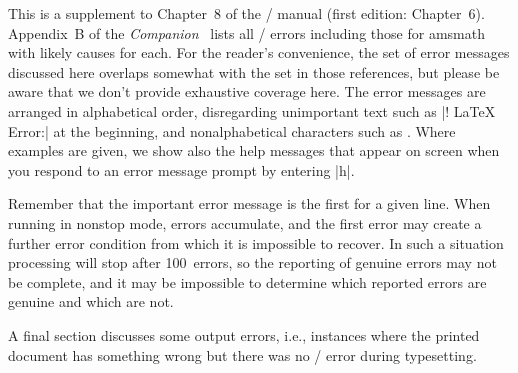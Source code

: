 \documentclass[leqno,titlepage,openany]{amsldoc}[1999/12/13]
\newcommand{\nipkg}{\textsf}
\begin{document}
This is a supplement to Chapter~8 of the \latex/ manual \cite{lamport}
(first edition: Chapter~6). Appendix~B of the
\textit{Companion}~\cite{tlc2} lists all \latex/ errors including those
for \nipkg{amsmath} with likely causes for each.  For the reader's
convenience, the set of error messages discussed here overlaps
somewhat with the set in those references,
but please be aware that we don't provide exhaustive coverage here.
The error messages are arranged in alphabetical order, disregarding
unimportant text such as |! LaTeX Error:| at the beginning, and
nonalphabetical characters such as \qc{\\}. Where examples are given, we
show also the help messages that appear on screen when you respond to an
error message prompt by entering |h|.

Remember that the important error message is the first for a given line.
When running in nonstop mode, errors accumulate, and the first error
may create a further error condition from which it is impossible to
recover.  In such a situation processing will stop after 100~errors,
so the reporting of genuine errors may not be complete, and it may be
impossible to determine which reported errors are genuine and which
are not.

A final section discusses some output errors, i.e., instances where
the printed document has something wrong but there was no \latex/
error during typesetting.

\enlargethispage{-2\baselineskip}
\end{document}
